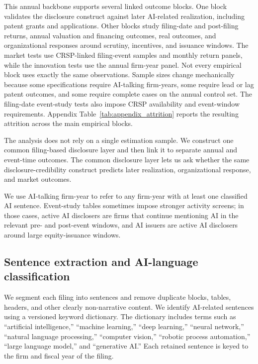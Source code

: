 This annual backbone supports several linked outcome blocks. One block validates the disclosure construct against later AI-related realization, including patent grants and applications. Other blocks study filing-date and post-filing returns, annual valuation and financing outcomes, real outcomes, and organizational responses around scrutiny, incentives, and issuance windows. The market tests use CRSP-linked filing-event samples and monthly return panels, while the innovation tests use the annual firm-year panel. Not every empirical block uses exactly the same observations. Sample sizes change mechanically because some specifications require AI-talking firm-years, some require lead or lag patent outcomes, and some require complete cases on the annual control set. The filing-date event-study tests also impose CRSP availability and event-window requirements. Appendix Table~\ref{tab:appendix_attrition} reports the resulting attrition across the main empirical blocks.

The analysis does not rely on a single estimation sample. We construct one common filing-based disclosure layer and then link it to separate annual and event-time outcomes. The common disclosure layer lets us ask whether the same disclosure-credibility construct predicts later realization, organizational response, and market outcomes.

We use AI-talking firm-year to refer to any firm-year with at least one classified AI sentence. Event-study tables sometimes impose stronger activity screens; in those cases, active AI disclosers are firms that continue mentioning AI in the relevant pre- and post-event windows, and AI issuers are active AI disclosers around large equity-issuance windows.

\subsection{Sentence extraction and AI-language classification}

We segment each filing into sentences and remove duplicate blocks, tables, headers, and other clearly non-narrative content. We identify AI-related sentences using a versioned keyword dictionary. The dictionary includes terms such as ``artificial intelligence,'' ``machine learning,'' ``deep learning,'' ``neural network,'' ``natural language processing,'' ``computer vision,'' ``robotic process automation,'' ``large language model,'' and ``generative AI.'' Each retained sentence is keyed to the firm and fiscal year of the filing.

